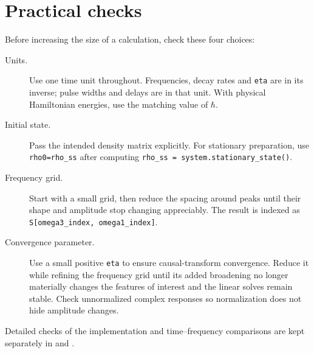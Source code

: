 \section{Practical checks}
\label{sec:validation}

Before increasing the size of a calculation, check these four choices:
\begin{description}
\item[Units.] Use one time unit throughout. Frequencies, decay rates and
\texttt{eta} are in its inverse; pulse widths and delays are in that unit.
With physical Hamiltonian energies, use the matching value of $\hbar$.
\item[Initial state.] Pass the intended density matrix explicitly.
For stationary preparation, use \texttt{rho0=rho\_ss} after computing
\texttt{rho\_ss = system.stationary\_state()}.
\item[Frequency grid.] Start with a small grid, then reduce the spacing
around peaks until their shape and amplitude stop changing appreciably.
The result is indexed as \texttt{S[omega3\_index, omega1\_index]}.
\item[Convergence parameter.] Use a small positive \texttt{eta} to ensure
causal-transform convergence. Reduce it while refining the frequency grid
until its added broadening no longer materially changes the features of
interest and the linear solves remain stable. Check unnormalized complex
responses so normalization does not hide amplitude changes.
\end{description}

Detailed checks of the implementation and time--frequency comparisons
are kept separately in  and
.
